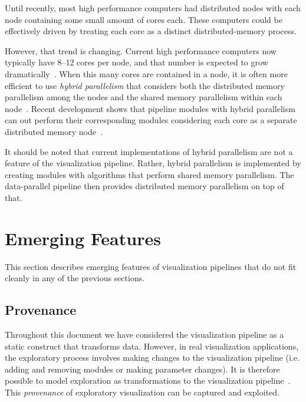 \documentclass[journal,twocolumn,10pt,letterpaper,twoside]{IEEEtran}
\newcommand*{\lcite}[1]{~\cite{#1}}
\newcommand*{\keyterm}[1]{\emph{#1}}
\begin{document}
Until recently, most high performance computers had distributed nodes with
each node containing some small amount of cores each.  These computers
could be effectively driven by treating each core as a distinct
distributed-memory process.

However, that trend is changing.  Current high performance computers now
typically have 8--12 cores per node, and that number is expected to grow
dramatically\lcite{ExascaleRoadMap,ASCACSummaryReport2010,ScientificDiscoveryExascale2011}.
When this many cores are contained in a node, it is often more efficient to
use \keyterm{hybrid parallelism} that considers both the distributed memory
parallelism among the nodes and the shared memory parallelism within each
node\lcite{Cappello2000}.  Recent development shows that pipeline
modules with hybrid parallelism can out perform their corresponding
modules considering each core as a separate distributed memory
node\lcite{Li2008,Camp2010,Howison2011}.

It should be noted that current implementations of hybrid parallelism are
not a feature of the visualization pipeline.  Rather, hybrid parallelism is
implemented by creating modules with algorithms that perform shared
memory parallelism.  The data-parallel pipeline then provides distributed
memory parallelism on top of that.

\section{Emerging Features}
\label{sec:EmergingFeatures}

This section describes emerging features of visualization pipelines that do
not fit cleanly in any of the previous sections.

\subsection{Provenance}
\label{sec:Provenance}

Throughout this document we have considered the visualization pipeline as a
static construct that transforms data.  However, in real visualization
applications, the exploratory process involves making changes to the
visualization pipeline (i.e. adding and removing modules or making
parameter changes).  It is therefore possible to model exploration as
transformations to the visualization pipeline\lcite{JankunKelly2002}.  This
\keyterm{provenance} of exploratory visualization can be captured and
exploited.
\end{document}
